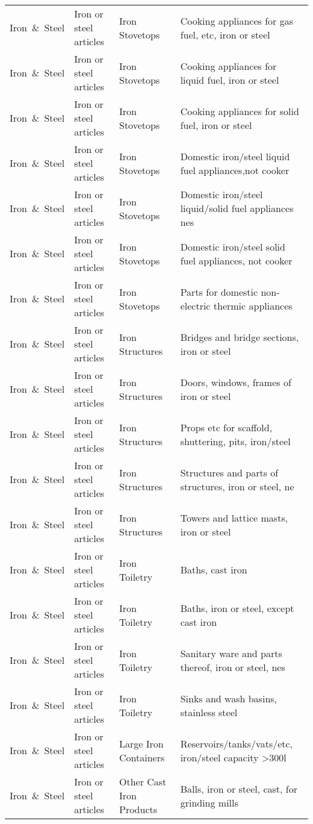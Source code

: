 \begin{appendices}
\begin{xltabular}{\textwidth}{|p{0.07\textwidth}|p{0.12\textwidth}|p{0.20\textwidth}|p{0.5\textwidth}|}
Iron\ \&\ Steel & Iron or steel articles & Iron Stovetops & Cooking appliances for gas fuel, etc, iron or steel \\
Iron\ \&\ Steel & Iron or steel articles & Iron Stovetops & Cooking appliances for liquid fuel, iron or steel \\
Iron\ \&\ Steel & Iron or steel articles & Iron Stovetops & Cooking appliances for solid fuel, iron or steel \\
Iron\ \&\ Steel & Iron or steel articles & Iron Stovetops & Domestic iron/steel liquid fuel appliances,not cooker \\
Iron\ \&\ Steel & Iron or steel articles & Iron Stovetops & Domestic iron/steel liquid/solid fuel appliances nes \\
Iron\ \&\ Steel & Iron or steel articles & Iron Stovetops & Domestic iron/steel solid fuel appliances, not cooker \\
Iron\ \&\ Steel & Iron or steel articles & Iron Stovetops & Parts for domestic non-electric thermic appliances \\
Iron\ \&\ Steel & Iron or steel articles & Iron Structures & Bridges and bridge sections, iron or steel \\
Iron\ \&\ Steel & Iron or steel articles & Iron Structures & Doors, windows, frames of iron or steel \\
Iron\ \&\ Steel & Iron or steel articles & Iron Structures & Props etc for scaffold, shuttering, pits, iron/steel \\
Iron\ \&\ Steel & Iron or steel articles & Iron Structures & Structures and parts of structures, iron or steel, ne \\
Iron\ \&\ Steel & Iron or steel articles & Iron Structures & Towers and lattice masts, iron or steel \\
Iron\ \&\ Steel & Iron or steel articles & Iron Toiletry & Baths, cast iron \\
Iron\ \&\ Steel & Iron or steel articles & Iron Toiletry & Baths, iron or steel, except cast iron \\
Iron\ \&\ Steel & Iron or steel articles & Iron Toiletry & Sanitary ware and parts thereof, iron or steel, nes \\
Iron\ \&\ Steel & Iron or steel articles & Iron Toiletry & Sinks and wash basins, stainless steel \\
Iron\ \&\ Steel & Iron or steel articles & Large Iron Containers & Reservoirs/tanks/vats/etc, iron/steel capacity >300l \\
Iron\ \&\ Steel & Iron or steel articles & Other Cast Iron Products & Balls, iron or steel, cast, for grinding mills \\

\end{xltabular}
\end{appendices}
